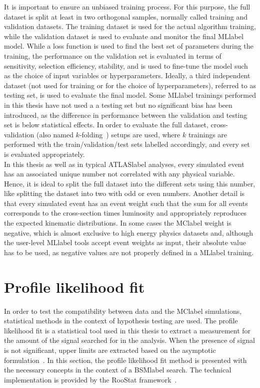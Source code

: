 It is important to ensure an unbiased training process. For this purpose, the full dataset is split at least in two orthogonal samples, normally called training and validation datasets. The training dataset is used for the actual algorithm training, while the validation dataset is used to evaluate and monitor the final \acrshort{MLlabel} model. While a loss function is used to find the best set of parameters during the training, the performance on the validation set is evaluated in terms of sensitivity, selection efficiency, stability, and is used to fine-tune the model such as the choice of input variables or hyperparameters. Ideally, a third independent dataset (not used for training or for the choice of hyperparameters), referred to as testing set, is used to evaluate the final model. Some \acrshort{MLlabel} trainings performed in this thesis have not used a a testing set but no significant bias has been introduced, as the difference in performance between the validation and testing set is below statistical effects. In order to evaluate the full dataset, cross-validation (also named $k$-folding~\cite{EncyclopediaofML}) setups are used, where $k$ trainings are performed with the train/validation/test sets labelled accordingly, and every set is evaluated appropriately.\\

In this thesis as well as in typical \acrshort{ATLASlabel} analyses, every simulated event has an associated unique number not correlated with any physical variable. Hence, it is ideal to split the full dataset into the different sets using this number, like splitting the dataset into two with odd or even numbers. Another detail is that every simulated event has an event weight such that the sum for all events corresponds to the cross-section times luminosity and appropriately reproduces the expected kinematic distributions. In some cases the \acrshort{MClabel} weight is negative, which is almost exclusive to high energy physics datasets and, although the user-level \acrshort{MLlabel} tools accept event weights as input, their absolute value has to be used, as negative values are not properly defined in a \acrshort{MLlabel} training.

\section{Profile likelihood fit}
\label{sec:profilelikelihoodfit}

In order to test the compatibility between data and the \acrshort{MClabel} simulations, statistical methods in the context of hypothesis testing are used. The profile likelihood fit is a statistical tool used in this thesis to extract a measurement for the amount of the signal searched for in the analysis. When the presence of signal is not significant, upper limits are extracted based on the asymptotic formulation~\cite{Cowan_2011}. In this section, the profile likelihood fit method is presented with the necessary concepts in the context of a \acrshort{BSMlabel} search.
The technical implementation is provided by the RooStat framework~\cite{10.48550/arxiv.1009.1003}.\\

